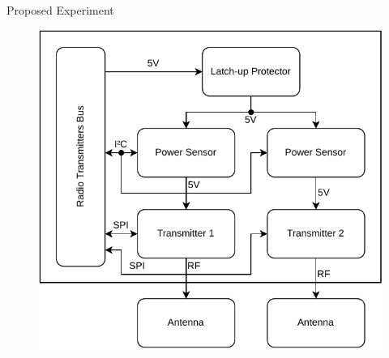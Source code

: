\begin{frame}{Proposed Experiment}

    \begin{figure}[!ht]
        \begin{center}
            \includegraphics[scale=0.55]{figures/radios-block-diagram}
        \end{center}
    \end{figure}

\end{frame}
